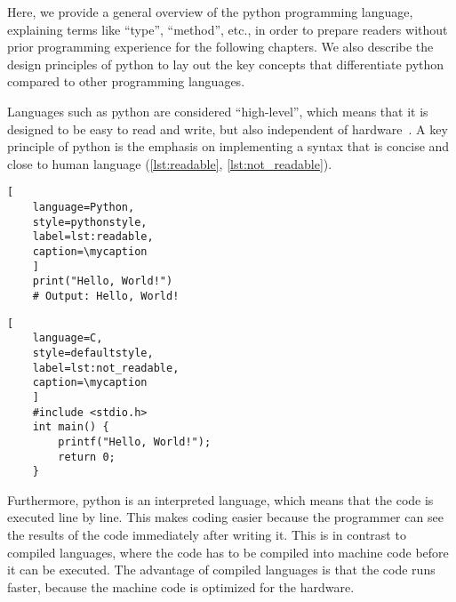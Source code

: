 Here, we provide a general overview of the python programming language,
explaining terms like ``type'', ``method'', etc., in order to prepare
readers without prior programming experience for the following chapters.
We also describe the design principles of python to lay out the key
concepts that differentiate python compared to other programming
languages.

Languages such as python are considered ``high-level'', which means that
it is designed to be easy to read and write, but also independent of
hardware~\cite{PythonLanguageReference}. A key principle of python is
the emphasis on implementing a syntax that is concise and close to human
language (\autoref{lst:readable}, \autoref{lst:not_readable}).

\def\mycaption{ Example of readable python code. This one-line code
    returns the words (string) \texttt{"Hello, World!"} when executed. The command
    is straightforward and easy to understand.}
\begin{lstlisting}[
    language=Python, 
    style=pythonstyle,
    label=lst:readable,
    caption=\mycaption
    ]
    print("Hello, World!")
    # Output: Hello, World!
\end{lstlisting}

\def\mycaption{ Example of less readable code written in the low-level
    programming language C. This code is doing exactly the same as the
    python code in \autoref{lst:readable}. The command is harder to
    understand because more steps are needed to access the same
    functionality, including the definition of a function}
\begin{lstlisting}[
    language=C, 
    style=defaultstyle,
    label=lst:not_readable, 
    caption=\mycaption
    ]
    #include <stdio.h>
    int main() {
        printf("Hello, World!");
        return 0;
    }
\end{lstlisting}

Furthermore, python is an interpreted language, which means that the
code is executed line by line. This makes coding easier because the
programmer can see the results of the code immediately after writing it.
This is in contrast to compiled languages, where the code has to be
compiled into machine code before it can be executed. The advantage of
compiled languages is that the code runs faster, because the machine
code is optimized for the hardware.

